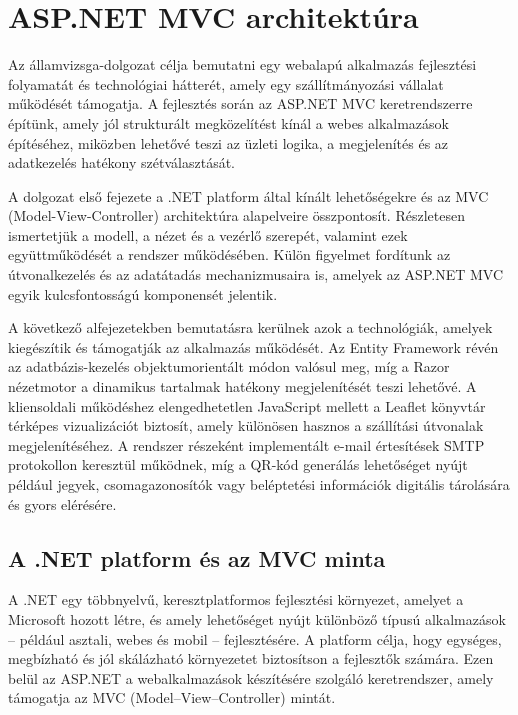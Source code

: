
\section{ASP.NET MVC architektúra}

\indent Az államvizsga-dolgozat célja bemutatni egy webalapú alkalmazás fejlesztési folyamatát és technológiai hátterét, amely egy szállítmányozási vállalat működését támogatja. A fejlesztés során az ASP.NET MVC keretrendszerre építünk, amely jól strukturált megközelítést kínál a webes alkalmazások építéséhez, miközben lehetővé teszi az üzleti logika, a megjelenítés és az adatkezelés hatékony szétválasztását.

A dolgozat első fejezete a .NET platform által kínált lehetőségekre és az MVC (Model-View-Controller) architektúra alapelveire összpontosít. Részletesen ismertetjük a modell, a nézet és a vezérlő szerepét, valamint ezek együttműködését a rendszer működésében. Külön figyelmet fordítunk az útvonalkezelés és az adatátadás mechanizmusaira is, amelyek az ASP.NET MVC egyik kulcsfontosságú komponensét jelentik.

A következő alfejezetekben bemutatásra kerülnek azok a technológiák, amelyek kiegészítik és támogatják az alkalmazás működését. Az Entity Framework révén az adatbázis-kezelés objektumorientált módon valósul meg, míg a Razor nézetmotor a dinamikus tartalmak hatékony megjelenítését teszi lehetővé. A kliensoldali működéshez elengedhetetlen JavaScript mellett a Leaflet könyvtár térképes vizualizációt biztosít, amely különösen hasznos a szállítási útvonalak megjelenítéséhez. A rendszer részeként implementált e-mail értesítések SMTP protokollon keresztül működnek, míg a QR-kód generálás lehetőséget nyújt például jegyek, csomagazonosítók vagy beléptetési információk digitális tárolására és gyors elérésére.


\subsection{A .NET platform és az MVC minta}

\indent A .NET egy többnyelvű, keresztplatformos fejlesztési környezet, amelyet a Microsoft hozott létre, és amely lehetőséget nyújt különböző típusú alkalmazások – például asztali, webes és mobil – fejlesztésére. A platform célja, hogy egységes, megbízható és jól skálázható környezetet biztosítson a fejlesztők számára. Ezen belül az ASP.NET a webalkalmazások készítésére szolgáló keretrendszer, amely támogatja az MVC (Model–View–Controller) mintát.

